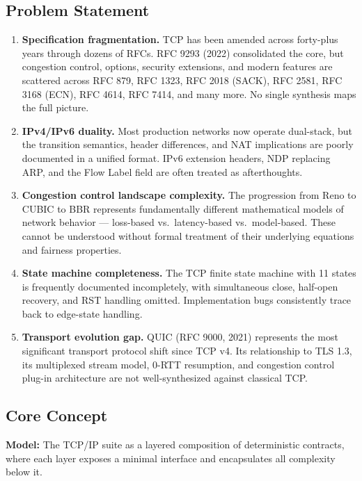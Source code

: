 \documentclass[11pt,letterpaper]{article}
\begin{document}
\subsection{Problem Statement}

\begin{enumerate}
  \item \textbf{Specification fragmentation.} TCP has been amended across forty-plus years through dozens of RFCs. RFC 9293 (2022) consolidated the core, but congestion control, options, security extensions, and modern features are scattered across RFC 879, RFC 1323, RFC 2018 (SACK), RFC 2581, RFC 3168 (ECN), RFC 4614, RFC 7414, and many more. No single synthesis maps the full picture.

  \item \textbf{IPv4/IPv6 duality.} Most production networks now operate dual-stack, but the transition semantics, header differences, and NAT implications are poorly documented in a unified format. IPv6 extension headers, NDP replacing ARP, and the Flow Label field are often treated as afterthoughts.

  \item \textbf{Congestion control landscape complexity.} The progression from Reno to CUBIC to BBR represents fundamentally different mathematical models of network behavior --- loss-based vs.\ latency-based vs.\ model-based. These cannot be understood without formal treatment of their underlying equations and fairness properties.

  \item \textbf{State machine completeness.} The TCP finite state machine with 11 states is frequently documented incompletely, with simultaneous close, half-open recovery, and RST handling omitted. Implementation bugs consistently trace back to edge-state handling.

  \item \textbf{Transport evolution gap.} QUIC (RFC 9000, 2021) represents the most significant transport protocol shift since TCP v4. Its relationship to TLS 1.3, its multiplexed stream model, 0-RTT resumption, and congestion control plug-in architecture are not well-synthesized against classical TCP.
\end{enumerate}

\subsection{Core Concept}

\textbf{Model:} The TCP/IP suite as a layered composition of deterministic contracts, where each layer exposes a minimal interface and encapsulates all complexity below it.
\end{document}
